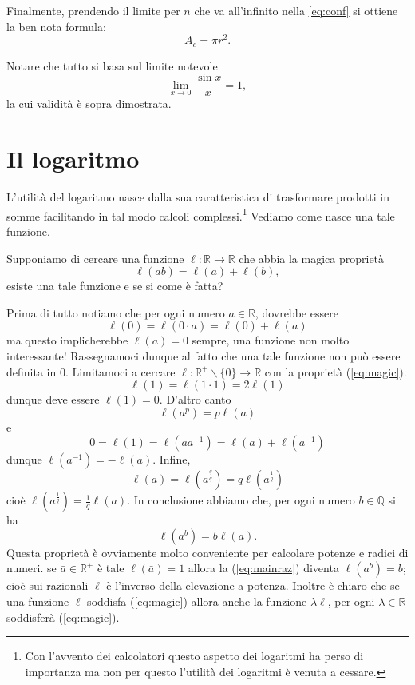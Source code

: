\documentclass[10pt, twoside]{article}
\numberwithin{equation}{section}
\newcommand\R{\mathbb R}
\newcommand\Q{{\mathbb Q}}
\begin{document}
Finalmente, prendendo il limite per $n$ che va all'infinito nella
\ref{eq:conf} si ottiene la ben nota formula:
\[
A_c=\pi r^2.
\]

Notare che tutto si basa sul limite notevole
\[
\lim_{x\to 0}\frac {\sin x}{x}=1,
\]
la cui validit\`a \`e sopra dimostrata.

\section{\sc \large Il logaritmo}

L'utilit\`a del logaritmo nasce dalla sua caratteristica di
trasformare prodotti in somme facilitando in tal modo calcoli
complessi.\footnote{Con l'avvento dei calcolatori questo aspetto dei
logaritmi ha perso di importanza ma non per questo l'utilit\`a dei
logaritmi \`e venuta a cessare.}
Vediamo come nasce una tale funzione.

Supponiamo di cercare una funzione $\ell:\R\to\R$ che abbia la magica
propriet\`a 
\begin{equation}\label{eq:magic}
\ell(ab)=\ell(a)+\ell(b),
\end{equation}
esiste una tale funzione e se si come \`e fatta?

Prima di tutto notiamo che per ogni numero $a\in\R$, dovrebbe essere
\[
\ell(0)=\ell(0\cdot a)=\ell(0)+\ell(a) 
\]
ma questo implicherebbe $\ell(a)=0$ sempre, una funzione non molto
interessante! Rassegnamoci dunque al fatto che una tale funzione non
pu\`o essere definita in $0$. Limitamoci a cercare
$\ell:\R^+\backslash\{0\}\to \R$ 
con la propriet\`a (\ref{eq:magic}).
\[
\ell(1)=\ell(1\cdot 1)=2\ell(1)
\]
dunque deve essere $\ell(1)=0$. D'altro canto
\[
\ell(a^p)=p\ell(a)
\]
e
\[
0=\ell(1)=\ell(aa^{-1})=\ell(a)+\ell(a^{-1})
\]
dunque $\ell(a^{-1})=-\ell(a)$. Infine,
\[
\ell(a)=\ell(a^{\frac qq})=q\ell(a^{\frac 1q})
\]
cio\`e $\ell(a^{\frac 1q})=\frac 1q\ell(a)$.
In conclusione abbiamo che, per ogni numero $b\in\Q$ si ha
\begin{equation}\label{eq:mainraz}
\ell(a^b)=b\ell(a).
\end{equation}
Questa propriet\`a \`e ovviamente molto conveniente per calcolare
potenze e radici di numeri. se $\bar a\in\R^+$ \`e tale $\ell(\bar
a)=1$ allora la (\ref{eq:mainraz}) diventa $\ell(a^b)=b$; cio\`e sui
razionali $\ell$ \`e l'inverso della elevazione a potenza. 
Inoltre \`e chiaro che se una funzione
$\ell$ soddisfa (\ref{eq:magic}) allora anche la funzione $\lambda
\ell$, per ogni $\lambda \in\R$ soddisfer\`a  (\ref{eq:magic}).
\end{document}
